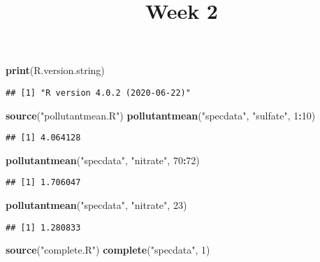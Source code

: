 \documentclass[
]{article}
\title{Week 2}
\author{}
\date{\vspace{-2.5em}}
\newenvironment{Shaded}{\begin{snugshade}}{\end{snugshade}}
\newcommand{\DecValTok}[1]{\textcolor[rgb]{0.00,0.00,0.81}{#1}}
\newcommand{\KeywordTok}[1]{\textcolor[rgb]{0.13,0.29,0.53}{\textbf{#1}}}
\newcommand{\NormalTok}[1]{#1}
\newcommand{\OperatorTok}[1]{\textcolor[rgb]{0.81,0.36,0.00}{\textbf{#1}}}
\newcommand{\StringTok}[1]{\textcolor[rgb]{0.31,0.60,0.02}{#1}}
\begin{document}
\maketitle

\begin{Shaded}
\begin{Highlighting}[]
\KeywordTok{print}\NormalTok{(R.version.string)}
\end{Highlighting}
\end{Shaded}

\begin{verbatim}
## [1] "R version 4.0.2 (2020-06-22)"
\end{verbatim}

\begin{Shaded}
\begin{Highlighting}[]
\KeywordTok{source}\NormalTok{(}\StringTok{"pollutantmean.R"}\NormalTok{)}
\KeywordTok{pollutantmean}\NormalTok{(}\StringTok{"specdata"}\NormalTok{, }\StringTok{"sulfate"}\NormalTok{, }\DecValTok{1}\OperatorTok{:}\DecValTok{10}\NormalTok{)}
\end{Highlighting}
\end{Shaded}

\begin{verbatim}
## [1] 4.064128
\end{verbatim}

\begin{Shaded}
\begin{Highlighting}[]
\KeywordTok{pollutantmean}\NormalTok{(}\StringTok{"specdata"}\NormalTok{, }\StringTok{"nitrate"}\NormalTok{, }\DecValTok{70}\OperatorTok{:}\DecValTok{72}\NormalTok{)}
\end{Highlighting}
\end{Shaded}

\begin{verbatim}
## [1] 1.706047
\end{verbatim}

\begin{Shaded}
\begin{Highlighting}[]
\KeywordTok{pollutantmean}\NormalTok{(}\StringTok{"specdata"}\NormalTok{, }\StringTok{"nitrate"}\NormalTok{, }\DecValTok{23}\NormalTok{)}
\end{Highlighting}
\end{Shaded}

\begin{verbatim}
## [1] 1.280833
\end{verbatim}

\begin{Shaded}
\begin{Highlighting}[]
\KeywordTok{source}\NormalTok{(}\StringTok{"complete.R"}\NormalTok{)}
\KeywordTok{complete}\NormalTok{(}\StringTok{"specdata"}\NormalTok{, }\DecValTok{1}\NormalTok{)}
\end{Highlighting}
\end{Shaded}
\end{document}
